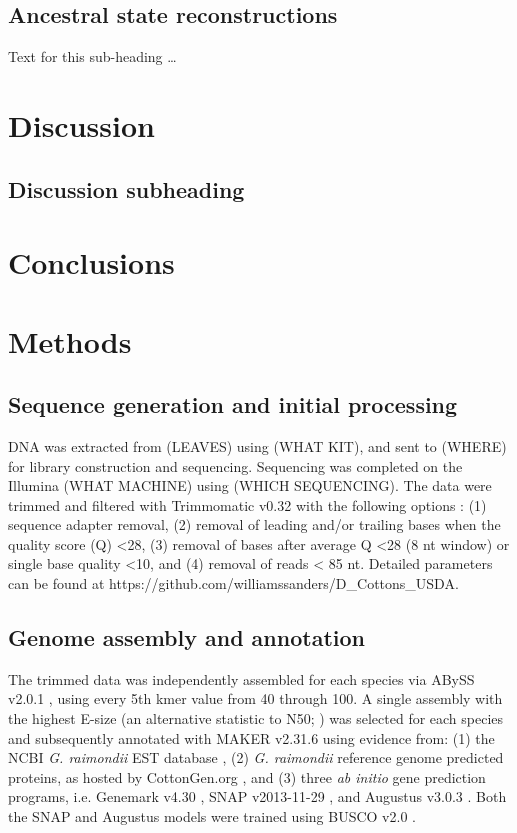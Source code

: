 \documentclass{bmcart}
\newcommand{\note}[2][]{\added[id=#1,remark={#2}]{}}
\begin{document}
\subsection*{Ancestral state reconstructions}
Text for this sub-heading \ldots

\section*{Discussion}
\subsection*{Discussion subheading}

\section*{Conclusions}

\section*{Methods}
\subsection*{Sequence generation and initial processing}
DNA was extracted from (LEAVES) using (WHAT KIT), and sent to (WHERE) for library construction and sequencing.  Sequencing was completed on the Illumina (WHAT MACHINE) using (WHICH SEQUENCING). The data were trimmed and filtered with Trimmomatic v0.32 \note[Corrinne]{citation} with the following options : (1) sequence adapter removal, (2) removal of leading and/or trailing bases when the quality score (Q) <28, (3) removal of bases after average Q <28 (8 nt window) or single base quality <10, and (4) removal of reads < 85 nt. Detailed parameters can be found at https://github.com/williamssanders/D\_Cottons\_USDA. \note[Corrinne]{Let's port this repo to a lab site after and give the new url}

\subsection*{Genome assembly and annotation}
The trimmed data was independently assembled for each species via ABySS v2.0.1 \note[Corrinne]{citation}, using every 5th kmer value from 40 through 100. A single assembly with the highest E-size  (an alternative statistic to N50; \note[Corrinne]{citation Salzberg 2011}) was selected for each species and subsequently annotated with MAKER v2.31.6 \note[Corrinne]{citation} using evidence from: (1) the NCBI \textit{G. raimondii} EST database \note[Corrinne]{citation}, (2) \textit{G. raimondii} reference genome predicted proteins, as hosted by CottonGen.org \note[Corrinne]{citation}, and (3) three \textit{ab initio} gene prediction programs, i.e. Genemark v4.30 \note[Corrinne]{citation}, SNAP v2013-11-29 \note[Corrinne]{citation}, and Augustus v3.0.3 \note[Corrinne]{citation}. Both the SNAP and Augustus models were trained using BUSCO v2.0 \note[Corrinne]{citation}.    
\end{document}
